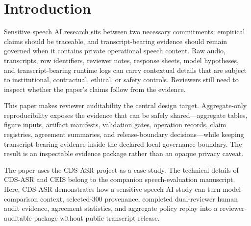 \section{Introduction}

Sensitive speech AI research sits between two necessary commitments: empirical claims should be traceable, and transcript-bearing evidence should remain governed when it contains private operational speech content. Raw audio, transcripts, row identifiers, reviewer notes, response sheets, model hypotheses, and transcript-bearing runtime logs can carry contextual details that are subject to institutional, contractual, ethical, or safety controls. Reviewers still need to inspect whether the paper's claims follow from the evidence.

This paper makes reviewer auditability the central design target. Aggregate-only reproducibility exposes the evidence that can be safely shared---aggregate tables, figure inputs, artifact manifests, validation gates, operation records, claim registries, agreement summaries, and release-boundary decisions---while keeping transcript-bearing evidence inside the declared local governance boundary. The result is an inspectable evidence package rather than an opaque privacy caveat.

The paper uses the CDS-ASR project as a case study. The technical details of CDS-ASR and CEIS belong to the companion speech-evaluation manuscript. Here, CDS-ASR demonstrates how a sensitive speech AI study can turn model-comparison context, selected-300 provenance, completed dual-reviewer human audit evidence, agreement statistics, and aggregate policy replay into a reviewer-auditable package without public transcript release.
